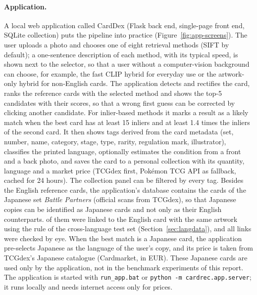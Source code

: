 \paragraph{Application.} A local web application called CardDex (Flask back end, single-page front end, SQLite collection) puts the pipeline into practice (Figure~\ref{fig:app-screens}). The user uploads a photo and chooses one of eight retrieval methods (SIFT by default); a one-sentence description of each method, with its typical speed, is shown next to the selector, so that a user without a computer-vision background can choose, for example, the fast CLIP hybrid for everyday use or the artwork-only hybrid for non-English cards. The application detects and rectifies the card, ranks the reference cards with the selected method and shows the top-5 candidates with their scores, so that a wrong first guess can be corrected by clicking another candidate. For inlier-based methods it marks a result as a likely match when the best card has at least 15 inliers and at least 1.4 times the inliers of the second card. It then shows tags derived from the card metadata (set, number, name, category, stage, type, rarity, regulation mark, illustrator), classifies the printed language, optionally estimates the condition from a front and a back photo, and saves the card to a personal collection with its quantity, language and a market price (TCGdex first, Pok\'emon TCG API as fallback, cached for 24 hours). The collection panel can be filtered by every tag. Besides the  English reference cards, the application's database contains the  cards of the Japanese set \emph{Battle Partners} (official scans from TCGdex), so that Japanese copies can be identified as Japanese cards and not only as their English counterparts.  of them were linked to the English card with the same artwork using the rule of the cross-language test set (Section~\ref{sec:langdata}), and all links were checked by eye. When the best match is a Japanese card, the application pre-selects Japanese as the language of the user's copy, and its price is taken from TCGdex's Japanese catalogue (Cardmarket, in EUR). These Japanese cards are used only by the application, not in the benchmark experiments of this report. The application is started with \texttt{run\_app.bat} or \texttt{python -m cardrec.app.server}; it runs locally and needs internet access only for prices.

